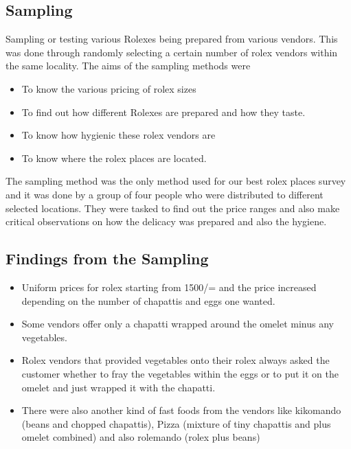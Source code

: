 \documentclass[12]{article}
\begin{document}
\subsection{Sampling}
Sampling or testing various Rolexes being prepared from various vendors. This was done through randomly selecting a certain number of rolex vendors within the same locality. The aims of the sampling methods were
\begin{itemize}
 \item To know the various pricing of rolex sizes
 \item To find out how different Rolexes are prepared and how they taste.
 \item To know how hygienic these rolex vendors are
 \item To know where the rolex places are located.
\end{itemize}

The sampling method was the only method used for our best rolex places survey and it was done by a group of four people who were distributed to different selected locations. They were tasked to find out the price ranges and also make critical observations on how the delicacy was prepared and also the hygiene.
\subsection{Findings from the Sampling}
\begin{itemize}
 \item Uniform prices for rolex starting from 1500/= and the price increased depending on the number of chapattis and eggs one wanted.
 \item Some vendors offer only a chapatti wrapped around the omelet minus any vegetables.
 \item Rolex vendors that provided vegetables onto their rolex always asked the customer whether to fray the vegetables within the eggs or to put it on the omelet and just wrapped it with the chapatti.
 \item There were also another kind of fast foods from the vendors like kikomando (beans and chopped chapattis), Pizza (mixture of tiny chapattis and plus omelet combined) and also rolemando (rolex plus beans)
\end{itemize}
	
\end{document}

